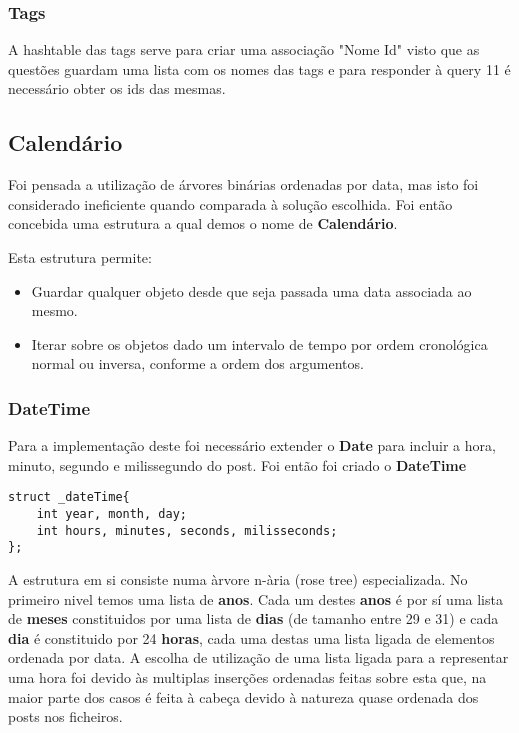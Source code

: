 \documentclass[10pt,a4paper]{article}
\begin{document}
        \subsubsection{Tags}
        A hashtable das tags serve para criar uma associação "Nome Id" visto que
        as questões guardam uma lista com os nomes das tags e para responder à
        query 11 é necessário obter os ids das mesmas.

    \subsection{Calendário}
        Foi pensada a utilização de árvores binárias ordenadas por data,
        mas isto foi considerado ineficiente quando comparada à solução
        escolhida. Foi então concebida uma estrutura a qual demos o nome
        de \textbf{Calendário}.

        Esta estrutura permite:
        \begin{itemize}
                \item Guardar qualquer objeto desde que seja
                      passada uma data associada ao mesmo.
                \item Iterar sobre os objetos dado um intervalo de tempo
                      por ordem cronológica normal ou inversa, conforme a
                      ordem dos argumentos.
        \end{itemize}
        \subsubsection{DateTime}
        Para a implementação deste foi necessário extender o \textbf{Date} para
        incluir a hora, minuto, segundo e milissegundo do post. Foi então foi
        criado o \textbf{DateTime}
    \begin{verbatim}
struct _dateTime{
    int year, month, day;
    int hours, minutes, seconds, milisseconds;
};
    \end{verbatim}
        A estrutura em si consiste numa àrvore n-ària (rose tree) especializada.
        No primeiro nivel temos uma lista de \textbf{anos}. Cada um destes
        \textbf{anos} é por sí uma lista de \textbf{meses} constituidos por
        uma lista de \textbf{dias} (de tamanho entre 29 e 31) e cada \textbf{dia}
        é constituido por 24 \textbf{horas}, cada uma destas uma lista ligada de
        elementos ordenada por data.
        A escolha de utilização de uma lista ligada para a representar uma hora
        foi devido às multiplas inserções ordenadas feitas sobre esta que, na
        maior parte dos casos é feita à cabeça devido à natureza quase ordenada
        dos posts nos ficheiros.
\end{document}
